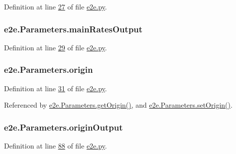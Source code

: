 Definition at line \hyperlink{e2e_8py_source_l00027}{27} of file \hyperlink{e2e_8py_source}{e2e.\+py}.

\subsubsection[{\texorpdfstring{main\+Rates\+Output}{mainRatesOutput}}]{\setlength{\rightskip}{0pt plus 5cm}e2e.\+Parameters.\+main\+Rates\+Output}\hypertarget{classe2e_1_1_parameters_a552470d8541b7caf2bb8940e32a6fe0e}{}\label{classe2e_1_1_parameters_a552470d8541b7caf2bb8940e32a6fe0e}


Definition at line \hyperlink{e2e_8py_source_l00029}{29} of file \hyperlink{e2e_8py_source}{e2e.\+py}.

\subsubsection[{\texorpdfstring{origin}{origin}}]{\setlength{\rightskip}{0pt plus 5cm}e2e.\+Parameters.\+origin}\hypertarget{classe2e_1_1_parameters_aff4d7aaa35295f7f71e546fe5554c4d9}{}\label{classe2e_1_1_parameters_aff4d7aaa35295f7f71e546fe5554c4d9}


Definition at line \hyperlink{e2e_8py_source_l00031}{31} of file \hyperlink{e2e_8py_source}{e2e.\+py}.



Referenced by \hyperlink{e2e_8py_source_l00078}{e2e.\+Parameters.\+get\+Origin()}, and \hyperlink{e2e_8py_source_l00075}{e2e.\+Parameters.\+set\+Origin()}.

\subsubsection[{\texorpdfstring{origin\+Output}{originOutput}}]{\setlength{\rightskip}{0pt plus 5cm}e2e.\+Parameters.\+origin\+Output}\hypertarget{classe2e_1_1_parameters_ab1ac2fc0ab2f3ef169b776c776cdb225}{}\label{classe2e_1_1_parameters_ab1ac2fc0ab2f3ef169b776c776cdb225}


Definition at line \hyperlink{e2e_8py_source_l00088}{88} of file \hyperlink{e2e_8py_source}{e2e.\+py}.



